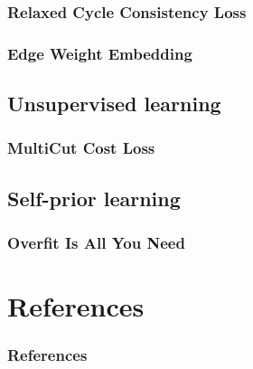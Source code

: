 \documentclass{beamer}
\begin{document}
\begin{frame}
    \frametitle{Relaxed Cycle Consistency Loss}

\end{frame}

\begin{frame}
    \frametitle{Edge Weight Embedding}



\end{frame}

\subsection{Unsupervised learning}

\begin{frame}
    \frametitle{MultiCut Cost Loss}

\end{frame}

\subsection{Self-prior learning}

\begin{frame}
    \frametitle{Overfit Is All You Need}



\end{frame}

\section*{References}

\begin{frame}[allowframebreaks]
    \frametitle{References}

    
    
\end{frame}
\end{document}
